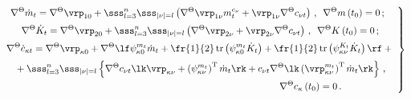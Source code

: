     \begin{equation}

    \left.

    \begin{array}{c}

  \hspace*{-2mm}\displaystyle \nabla^\Theta \dot m_t =\nabla^\Theta \vrp_{10} +\sss_{l=3}^n \sss_{|\nu |=l} 

    \left( \nabla^\Theta  \vrp_{1\nu} m_t^{c_\nu} + \vrp_{1\nu} \nabla^\Theta  

    c_{\nu t}\right)\,, \enskip \nabla^\Theta  m \left(t_0\right) =0\,;

\\[6pt]

      \displaystyle  \nabla^\Theta \dot K_t = \nabla^\Theta  \vrp_{20} +\sss_{l=3}^n \sss_{|\nu  |=l} 

     \left(\nabla^\Theta \vrp_{2\nu} +\vrp_{2\nu} \nabla^\Theta  c_{\nu t}\right)\,,

     \enskip \nabla^\Theta K\left(t_0\right) =0\,;

\\[6pt]

        \displaystyle   \nabla^\Theta  \dot c_{\kappa t} = \nabla^\Theta  \vrp_{\kappa 0} + \nabla^\Theta 

    \lf \psi_{\kappa 0}^{m_t} \dot m_t + \fr{1}{2}\,\mathrm{tr} 

    \left( \psi_{\kappa 0}^{m_t}\dot K_t\right) +

    \fr{1}{2}\,\mathrm{tr} \left(\psi_{\kappa \nu}^{K_t} \dot K_t\right) \rf + {}\\[6pt]

   \displaystyle{}+ \sss_{l=3}^n \sss_{|\nu | =l} \left\{ 

\nabla^\Theta  c_{\nu t} \lk \vrp_{\kappa\nu} +

\left(\psi_{\kappa\nu}^{m_t}\right)^{\mathrm{T}}

 \dot m_t\rk + c_{\nu t} \nabla^\Theta  \lk \left(\vrp_{\kappa \nu}^{m_t}\right)^{\mathrm{T}}

  \dot m_t\rk\right\}\,,\\[6pt] 

 \hspace*{81mm}\displaystyle \nabla^\Theta c_\kappa \left(t_0\right)=0\,.

  \end{array}\!

  \right\}\!

  \label{e5.8-s2}

  \end{equation}





